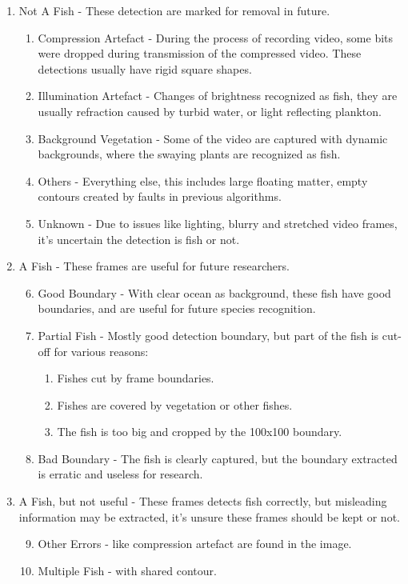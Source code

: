 \documentclass[bsc,logo,twoside,fullspacing,parskip]{infthesis}
\begin{document}
\renewcommand{\labelenumi}{\Roman{enumi}}
\renewcommand{\labelenumii}{\arabic{enumii}}
\renewcommand{\labelenumiii}{\roman{enumiii}}
\begin{enumerate}
 \item Not A Fish - These detection are marked for removal in future.
 \begin{enumerate}
   \item Compression Artefact - During the process of recording video, some bits were dropped during transmission of the compressed video. These detections usually have rigid square shapes.
   \item Illumination Artefact - Changes of brightness recognized as fish, they are usually refraction caused by turbid water, or light reflecting plankton.
   \item Background Vegetation - Some of the video are captured with dynamic backgrounds, where the swaying plants are recognized as fish.
   \item Others - Everything else, this includes large floating matter, empty contours created by faults in previous algorithms.
   \item Unknown - Due to issues like lighting, blurry and stretched video frames, it's uncertain the detection is fish or not.
 \end{enumerate}
 
 \item A Fish - These frames are useful for future researchers.
 \begin{enumerate}
   \setcounter{enumii}{5} 
   \item Good Boundary - With clear ocean as background, these fish have good boundaries, and are useful for future species recognition.
   \item Partial Fish - Mostly good detection boundary, but part of the fish is cut-off for various reasons:
    \begin{enumerate}
      \item Fishes cut by frame boundaries.
      \item Fishes are covered by vegetation or other fishes.
      \item The fish is too big and cropped by the 100x100 boundary.
    \end{enumerate}
   \item Bad Boundary - The fish is clearly captured, but the boundary extracted is erratic and useless for research. 
 \end{enumerate}
 
 \item A Fish, but not useful - These frames detects fish correctly, but misleading information may be extracted, it's unsure these frames should be kept or not.
 \begin{enumerate}
   \setcounter{enumii}{8} 
   \item Other Errors - like compression artefact are found in the image.
   \item Multiple Fish - with shared contour.
 \end{enumerate}
\end{enumerate}
\end{document}
